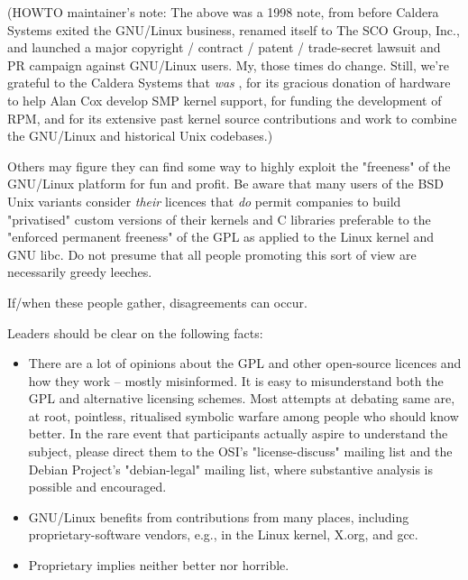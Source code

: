 \documentclass{HOWTO}
\begin{document}
(HOWTO maintainer's note:  The above was a 1998 note, from before
Caldera Systems exited the GNU/Linux business, renamed itself to The SCO Group,
Inc., and launched a major copyright / contract / patent / trade-secret
lawsuit and PR campaign against GNU/Linux users.  My, those times do change.
Still, we're grateful to the Caldera Systems that {\itshape  was \/}, for
its gracious donation of hardware to help Alan Cox develop SMP kernel
support, for funding the development of RPM, and for its extensive past
kernel source contributions and work to combine the GNU/Linux and historical
Unix codebases.)



 
Others may figure they can find some way to highly exploit the
"freeness" of the GNU/Linux platform for fun and profit. Be aware that many
users of the BSD Unix variants consider {\itshape their\/} licences that
{\itshape do\/} permit companies to build "privatised" custom versions of
their kernels and C libraries preferable to the "enforced permanent
freeness" of the GPL as applied to the Linux kernel and GNU libc.  Do
not presume that all people promoting this sort of view are necessarily
greedy leeches.



 
If/when these people gather, disagreements can occur.



 
Leaders should be clear on the following facts:

\begin{itemize}
\item There are a lot of opinions about the GPL and other open-source
licences and how they work -- mostly misinformed.  It is easy to
misunderstand both the GPL and alternative licensing schemes.  Most
attempts at debating same are, at root,  pointless, ritualised symbolic
warfare among people who should know better.  In the rare event that
participants actually aspire to understand the subject, please direct
them to the OSI's "license-discuss" mailing list and the Debian
Project's "debian-legal" mailing list, where substantive analysis is
possible and encouraged.
\item  GNU/Linux benefits from contributions from many places, including
proprietary-software vendors, e.g., in the Linux kernel, X.org, and
gcc.
\item  Proprietary implies neither better nor horrible.
\end{itemize}
\end{document}
